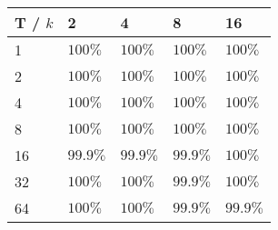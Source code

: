 \documentclass{article}
\begin{document}
    \begin{minipage}{0.45\textwidth}
        \begin{table}[H]
            \begin{center}
                \begin{tabular}[c]{|l|l|l|l|l|}
                    \hline
                    T / \( k \) & 2& 4 & 8 & 16   \\
                    \hline
                    1&\( 100\% \)&\( 100\% \)& \( 100\% \)&\( 100\% \) \\
                    \hline
                    2&\( 100\% \)&\( 100\% \)& \( 100\% \)&\( 100\% \) \\
                    \hline
                    4&\( 100\% \)&\( 100\% \)& \( 100\% \)&\( 100\% \) \\
                    \hline
                    8&\( 100\% \)&\( 100\% \)& \( 100\% \)&\( 100\% \) \\
                    \hline
                    16&\( 99.9\% \)&\( 99.9\% \)& \( 99.9\% \)&\( 100\% \) \\
                    \hline
                    32&\( 100\% \)&\( 100\% \)& \( 99.9\% \)&\( 100\% \) \\
                    \hline
                    64&\( 100\% \)&\( 100\% \)& \( 99.9\% \)&\( 99.9\% \) \\
                    \hline
                \end{tabular}
            \end{center}
        \end{table}
    \end{minipage}
    \newline
\end{document}
